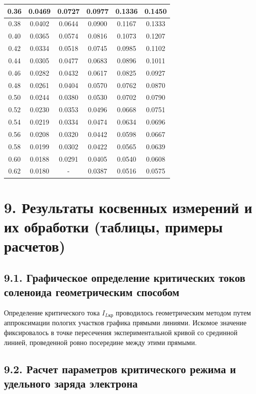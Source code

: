 \documentclass[a4paper,12pt]{article}
\begin{document}
\begin{longtable}{|c|c|c|c|c|c|}
    0.36 & 0.0469 & 0.0727 & 0.0977 & 0.1336 & 0.1450 \\ \hline
    0.38 & 0.0402 & 0.0644 & 0.0900 & 0.1167 & 0.1333 \\ \hline
    0.40 & 0.0365 & 0.0574 & 0.0816 & 0.1073 & 0.1207 \\ \hline
    0.42 & 0.0334 & 0.0518 & 0.0745 & 0.0985 & 0.1102 \\ \hline
    0.44 & 0.0305 & 0.0477 & 0.0683 & 0.0896 & 0.1011 \\ \hline
    0.46 & 0.0282 & 0.0432 & 0.0617 & 0.0825 & 0.0927 \\ \hline
    0.48 & 0.0261 & 0.0404 & 0.0570 & 0.0762 & 0.0870 \\ \hline
    0.50 & 0.0244 & 0.0380 & 0.0530 & 0.0702 & 0.0790 \\ \hline
    0.52 & 0.0230 & 0.0353 & 0.0496 & 0.0668 & 0.0751 \\ \hline
    0.54 & 0.0219 & 0.0334 & 0.0474 & 0.0634 & 0.0696 \\ \hline
    0.56 & 0.0208 & 0.0320 & 0.0442 & 0.0598 & 0.0667 \\ \hline
    0.58 & 0.0199 & 0.0302 & 0.0422 & 0.0565 & 0.0639 \\ \hline
    0.60 & 0.0188 & 0.0291 & 0.0405 & 0.0540 & 0.0608 \\ \hline
    0.62 & 0.0180 & - & 0.0387 & 0.0516 & 0.0575 \\ \hline
\end{longtable}

\section*{\hspace{30pt}9. Результаты косвенных измерений и их обработки (таблицы, примеры расчетов)}

\subsection*{9.1. Графическое определение критических токов соленоида геометрическим способом}
Определение критического тока $I_{L\text{кр}}$ проводилось геометрическим методом путем аппроксимации пологих участков графика прямыми линиями. Искомое значение фиксировалось в точке пересечения экспериментальной кривой со срединной линией, проведенной ровно посередине между этими прямыми.

\subsection*{9.2. Расчет параметров критического режима и удельного заряда электрона}
\end{document}
